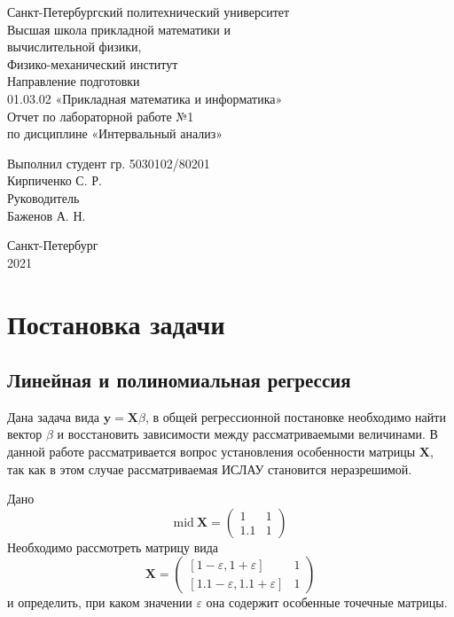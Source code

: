\documentclass[a4paper]{article}
\begin{document}
\large
\begin{center}
    Санкт-Петербургский политехнический университет\\
    Высшая школа прикладной математики и\\вычислительной физики,\\ 
    Физико-механический институт\\
    \vspace{3em}
    Направление подготовки\\
    01.03.02 «Прикладная математика и информатика»\\
    \vspace{10em}
    \Large
    Отчет по лабораторной работе №1 \\
    по дисциплине «Интервальный анализ»
    \vspace{19em}
    \large
\end{center}
Выполнил студент гр. 5030102/80201\\
Кирпиченко С. Р.\\
Руководитель\\
Баженов А. Н.
\vspace{10em}
\begin{center}
    Санкт-Петербург\\
    2021
\end{center}
\thispagestyle{empty}
\newpage
\tableofcontents
{}
\newpage
\listoffigures
{}
\newpage
\section{Постановка задачи}
\subsection{Линейная и полиномиальная регрессия}
Дана задача вида $\mathbf{y}=\mathbf{X}\beta$, в общей регрессионной постановке необходимо найти вектор $\beta$ и восстановить зависимости между рассматриваемыми величинами. В данной работе рассматривается вопрос установления особенности матрицы $\mathbf{X}$, так как в этом случае рассматриваемая ИСЛАУ становится неразрешимой. 

Дано 
\begin{equation}
    \mathrm{mid}\:\mathbf{X}=\begin{pmatrix}
      1& 1\\
      1.1& 1
    \end{pmatrix}
\end{equation}
Необходимо рассмотреть матрицу вида 
\begin{equation}\label{mat:reg}
\mathbf{X}=\begin{pmatrix}
  [1-\varepsilon,1+\varepsilon]& 1\\
  [1.1-\varepsilon,1.1+\varepsilon]& 1
\end{pmatrix}
\end{equation}
и определить, при каком значении $\varepsilon$ она содержит особенные точечные матрицы.
\end{document}
